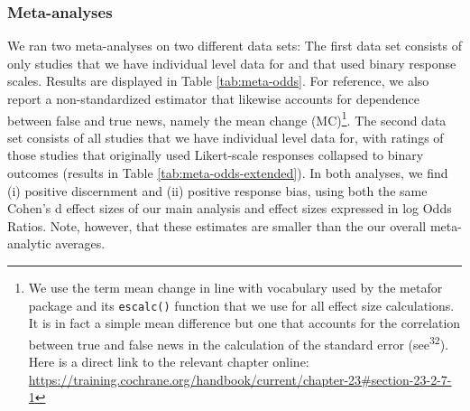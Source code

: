 \documentclass[
  man]{apa6}
\begin{document}
\subsubsection{Meta-analyses}\label{meta-analyses}

We ran two meta-analyses on two different data sets: The first data set consists of only studies that we have individual level data for and that used binary response scales. Results are displayed in Table \ref{tab:meta-odds}. For reference, we also report a non-standardized estimator that likewise accounts for dependence between false and true news, namely the mean change (MC)\footnote{We use the term mean change in line with vocabulary used by the metafor package and its \texttt{escalc()} function that we use for all effect size calculations. It is in fact a simple mean difference but one that accounts for the correlation between true and false news in the calculation of the standard error (see\textsuperscript{32}). Here is a direct link to the relevant chapter online: \url{https://training.cochrane.org/handbook/current/chapter-23\#section-23-2-7-1}}. The second data set consists of all studies that we have individual level data for, with ratings of those studies that originally used Likert-scale responses collapsed to binary outcomes (results in Table \ref{tab:meta-odds-extended}). In both analyses, we find (i) positive discernment and (ii) positive response bias, using both the same Cohen's d effect sizes of our main analysis and effect sizes expressed in log Odds Ratios. Note, however, that these estimates are smaller than the our overall meta-analytic averages.
\end{document}
